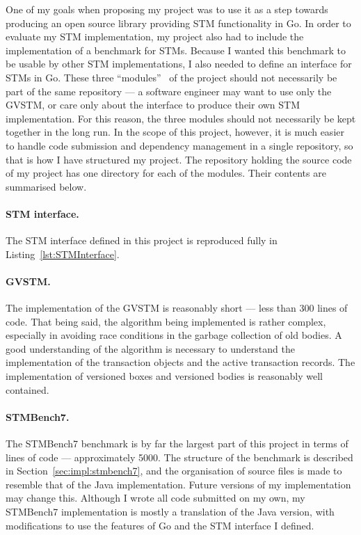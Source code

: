 \documentclass[12pt,a4paper,oneside,openright]{report}
\begin{document}
One of my goals when proposing my project was to use it as a step
towards producing an open source library providing STM functionality
in Go. In order to evaluate my STM implementation, my project also had
to include the implementation of a benchmark for STMs. Because I
wanted this benchmark to be usable by other STM implementations, I
also needed to define an interface for STMs in Go. These three
``modules''~\cite[Section~1.1]{SoftwareArchitecture} of the project
should not necessarily be part of the same repository --- a software
engineer may want to use only the GVSTM, or care only about the
interface to produce their own STM implementation. For this reason,
the three modules should not necessarily be kept together in the long
run. In the scope of this project, however, it is much easier to
handle code submission and dependency management in a single
repository, so that is how I have structured my project. The
repository holding the source code of my project has one directory for
each of the modules. Their contents are summarised below.

\paragraph{STM interface.} The STM interface defined in this project
is reproduced fully in Listing~\ref{lst:STMInterface}.

\paragraph{GVSTM.} The implementation of the GVSTM is reasonably short
--- less than 300 lines of code. That being said, the algorithm being
implemented is rather complex, especially in avoiding race conditions
in the garbage collection of old bodies. A good understanding of the
algorithm is necessary to understand the implementation of the
transaction objects and the active transaction records. The
implementation of versioned boxes and versioned bodies is reasonably
well contained.

\paragraph{STMBench7.} The STMBench7 benchmark is by far the largest
part of this project in terms of lines of code --- approximately
5000. The structure of the benchmark is described in
Section~\ref{sec:impl:stmbench7}, and the organisation of source files
is made to resemble that of the Java implementation. Future versions
of my implementation may change this. Although I wrote all code
submitted on my own, my STMBench7 implementation is mostly a
translation of the Java version, with modifications to use the
features of Go and the STM interface I defined.
\end{document}
